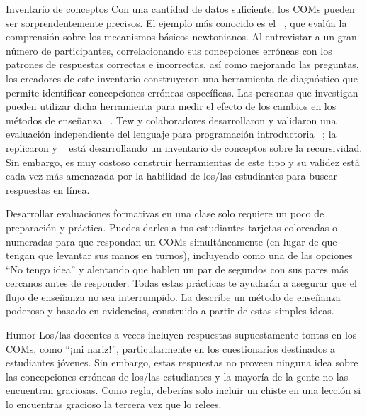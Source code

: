 \begin{aside}{Inventario de conceptos}
Con una cantidad de datos suficiente,
los COMs pueden ser sorprendentemente precisos.
El ejemplo más conocido es el
  ~\cite{Hest1992},
que evalúa la comprensión sobre los mecanismos básicos newtonianos.
Al entrevistar a un gran número de participantes,
correlacionando sus concepciones erróneas con los patrones de respuestas correctas e incorrectas,
así como mejorando las preguntas,
los creadores de este inventario construyeron una herramienta de diagnóstico que permite identificar concepciones erróneas específicas.
Las personas  que investigan pueden utilizar dicha herramienta para medir el efecto de los cambios en los métodos de enseñanza ~\cite{Hake1998}.
Tew y colaboradores desarrollaron y validaron una evaluación independiente del lenguaje para programación introductoria ~\cite{Tew2011};  \cite{Park2016} la replicaron y ~\cite{Hamo2017} está desarrollando un inventario de conceptos sobre la recursividad.
Sin embargo,
es muy costoso construir herramientas de este tipo
y su validez está cada vez más amenazada por la habilidad de los/las estudiantes para buscar respuestas en línea.
\end{aside}

Desarrollar evaluaciones formativas en una clase solo requiere un poco de preparación y práctica.
Puedes darles a tus estudiantes tarjetas coloreadas o numeradas para que respondan un COMs simultáneamente (en lugar de que tengan que levantar sus manos en turnos), incluyendo como una de las opciones ``No tengo idea''
y alentando que hablen un par de segundos con sus pares más cercanos antes de responder. Todas estas prácticas te ayudarán a asegurar que el flujo de enseñanza no sea interrumpido.
La  describe un método de enseñanza poderoso y basado en evidencias, construido a partir de estas simples ideas. 

\begin{aside}{Humor}
Los/las docentes a veces incluyen respuestas supuestamente tontas en los COMs, como ``¡mi nariz!'', particularmente en los cuestionarios destinados a estudiantes jóvenes.
Sin embargo,
estas respuestas no proveen ninguna idea sobre las concepciones erróneas de los/las estudiantes y la mayoría de la gente no las encuentran graciosas.
Como regla,
deberías solo incluir un chiste en una lección si lo encuentras gracioso la tercera vez que lo relees.
\end{aside}

